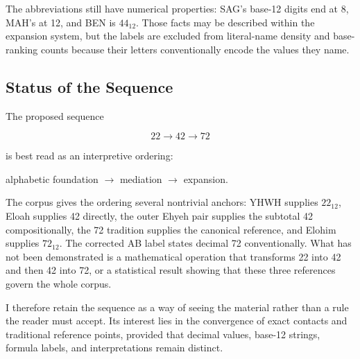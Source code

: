 The abbreviations still have numerical properties: SAG's base-12 digits end at 8, MAH's at 12, and BEN is $44_{12}$. Those facts may be described within the expansion system, but the labels are excluded from literal-name density and base-ranking counts because their letters conventionally encode the values they name.

\subsection{Status of the Sequence}

The proposed sequence

\[
22 \longrightarrow 42 \longrightarrow 72
\]

is best read as an interpretive ordering:

\begin{center}
alphabetic foundation $\longrightarrow$ mediation $\longrightarrow$ expansion.
\end{center}

The corpus gives the ordering several nontrivial anchors: YHWH supplies $22_{12}$, Eloah supplies 42 directly, the outer Ehyeh pair supplies the subtotal 42 compositionally, the 72 tradition supplies the canonical reference, and Elohim supplies $72_{12}$. The corrected AB label states decimal 72 conventionally. What has not been demonstrated is a mathematical operation that transforms 22 into 42 and then 42 into 72, or a statistical result showing that these three references govern the whole corpus.

I therefore retain the sequence as a way of seeing the material rather than a rule the reader must accept. Its interest lies in the convergence of exact contacts and traditional reference points, provided that decimal values, base-12 strings, formula labels, and interpretations remain distinct.
